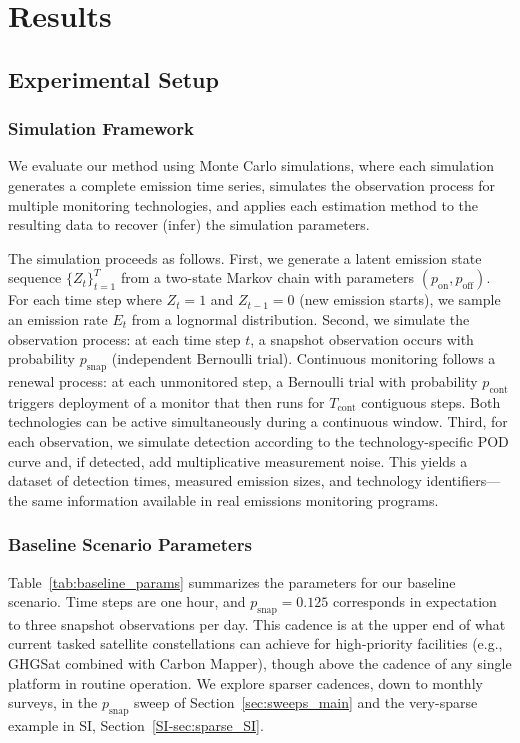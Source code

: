 \documentclass[numsec,webpdf,modern,mediumone]{oup-authoring-template}
\newcommand{\edit}[1]{#1}
\begin{document}
\newpage

\section{Results}
\label{sec:results}


\subsection{Experimental Setup}

\subsubsection{Simulation Framework}

We evaluate our method using Monte Carlo simulations, where each simulation generates a complete emission time series, simulates the observation process for multiple monitoring technologies, and applies each estimation method to the resulting data to recover (infer) the simulation parameters.

The simulation proceeds as follows. First, we generate a latent emission state sequence $\{Z_t\}_{t=1}^T$ from a two-state Markov chain with parameters $(p_{\text{on}}, p_{\text{off}})$. For each time step where $Z_t = 1$ and $Z_{t-1}=0$ (new emission starts), we sample an emission rate $E_t$ from a lognormal distribution. Second, we simulate the observation process: at each time step $t$, a snapshot observation occurs with probability $p_{\text{snap}}$ (independent Bernoulli trial). Continuous monitoring follows a renewal process: at each unmonitored step, a Bernoulli trial with probability $p_{\text{cont}}$ triggers deployment of a monitor that then runs for $T_{\text{cont}}$ contiguous steps. Both technologies can be active simultaneously during a continuous window. Third, for each observation, we simulate detection according to the technology-specific POD curve and, if detected, add multiplicative measurement noise. This yields a dataset of detection times, measured emission sizes, and technology identifiers---the same information available in real emissions monitoring programs.

\subsubsection{Baseline Scenario Parameters}

\edit{Table~\ref{tab:baseline_params} summarizes the parameters for our baseline scenario. Time steps are one hour, and $p_{\text{snap}} = 0.125$ corresponds in expectation to three snapshot observations per day. This cadence is at the upper end of what current tasked satellite constellations can achieve for high-priority facilities (e.g., GHGSat combined with Carbon Mapper), though above the cadence of any single platform in routine operation. We explore sparser cadences, down to monthly surveys, in the $p_{\text{snap}}$ sweep of Section~\ref{sec:sweeps_main} and the very-sparse example in SI, Section~\ref{SI-sec:sparse_SI}.}
\end{document}
